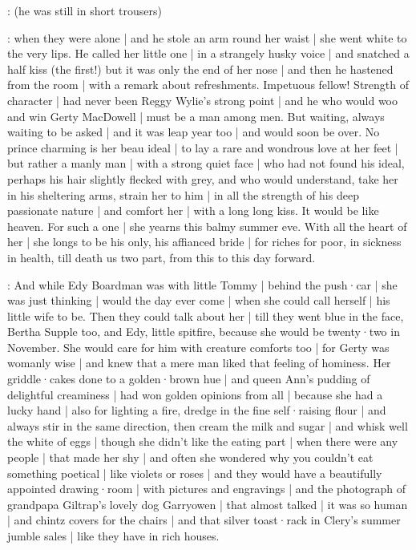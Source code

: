 \gertyReal:
(he was still in short trousers)

\gertyNovel:
when they were alone |
and he stole an arm round her waist |
she went white
to the very lips.
He called her little one |
in a strangely husky voice |
and snatched a half kiss
(the first!)
but it was only the end of her nose |
and then he hastened from the room |
with a remark about refreshments.
Impetuous fellow!
Strength of character |
had never been Reggy Wylie's strong point |
and he who would woo and win Gerty MacDowell |
must be a man among men.
But waiting,
always waiting to be asked |
and it was leap year too |
and would soon be over.
No prince charming is her beau ideal |
to lay a rare and wondrous love at her feet |
but rather a manly man |
with a strong quiet face |
who had not found his ideal,
perhaps his hair slightly flecked with grey,
and who would understand,
take her in his sheltering arms,
strain her to him |
in all the strength of his deep passionate nature |
and comfort her |
with a long long kiss.
It would be like heaven.
For such a one |
she yearns this balmy summer eve.
With all the heart of her |
she longs to be his only,
his affianced bride |
for riches
for poor,
in sickness
in health,
till death us two part,
from this
to this day forward.

\gertyReal:
And while Edy Boardman was with little Tommy |
behind the push·car |
she was just thinking |
would the day ever come |
when she could call herself |
his little wife to be.%
Then they could talk about her |
till they went blue in the face,
Bertha Supple too,
and Edy,
little spitfire,
because she would be twenty·two in November.
She would care for him with creature comforts too |
for Gerty was womanly wise |
and knew that a mere man liked that feeling of hominess.
Her griddle·cakes done to a golden·brown hue |
and queen Ann's pudding of delightful creaminess |
had won golden opinions from all |
because she had a lucky hand |
also for lighting a fire,
dredge in the fine self·raising flour |
and always stir in the same direction,
then cream the milk and sugar |
and whisk well the white of eggs |
though she didn't like the eating part |
when there were any people |
that made her shy |
and often
she wondered why you couldn't eat something poetical |
like violets or roses |
and they would have a beautifully appointed drawing·room |
with pictures and engravings |
and the photograph of grandpapa Giltrap's lovely dog Garryowen |
that almost talked |
it was so human |
and chintz covers for the chairs |
and that silver toast·rack in Clery's summer jumble sales |
like they have in rich houses.

